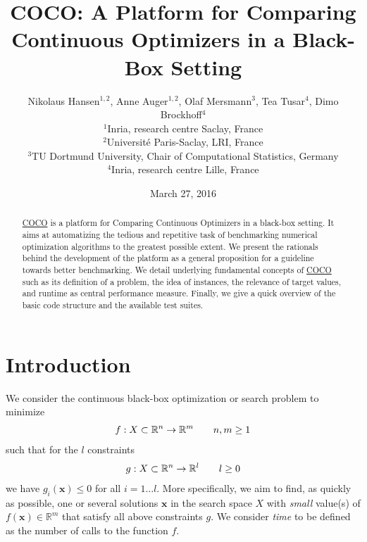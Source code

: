 \documentclass[letterpaper,12pt,english]{article}
\title{{COCO}: {A} Platform for Comparing Continuous Optimizers in a Black-Box Setting}
\date{March 27, 2016}
\author{Nikolaus Hansen$^{1,2}$, 
      Anne Auger$^{1,2}$, 
      Olaf Mersmann$^3$, 
      Tea Tusar$^4$, 
      Dimo Brockhoff$^4$
  \\
    $^1$Inria, research centre Saclay, France
  \\
   $^2$Universit\'e Paris-Saclay, LRI, France
  \\
    $^3$TU Dortmund University, Chair of Computational Statistics, Germany
  \\
    $^4$Inria, research centre Lille, France
    }
\newcommand{\chapter}[1]{}  %
\newcommand{\ve}[1]{{\boldsymbol{#1}}}
\newcommand{\x}{\ensuremath{\ve{x}}}
\begin{document}
\maketitle
{}\label{index::doc}



\chapter{CHAPTERTITLE}
\label{index:coco-a-platform-for-comparing-continuous-optimizers-in-a-black-box-setting}\label{index:chaptertitle}%
\begin{abstract}
\href{https://github.com/numbbo/coco}{COCO} is a platform for Comparing Continuous Optimizers in a black-box
setting.
It aims at automatizing the tedious and repetitive task of
benchmarking numerical optimization algorithms to the greatest possible
extent.
We present the rationals behind the development of the platform
as a general proposition for a guideline towards better benchmarking.
We detail underlying fundamental concepts of
\href{https://github.com/numbbo/coco}{COCO} such as its definition of
a problem, the idea of instances, the relevance of target values, and runtime
as central performance measure.
Finally, we  give a quick overview of the basic
code structure and the available test suites.
\end{abstract}\tableofcontents
\newpage

\section{Introduction}
\label{index:introduction}
We consider the continuous black-box optimization or search problem to minimize
\begin{gather}
\begin{split}f: X\subset\mathbb{R}^n \to \mathbb{R}^m \qquad n,m\ge1\end{split}\notag
\end{gather}
such that for the \(l\) constraints
\begin{gather}
\begin{split}g: X\subset\mathbb{R}^n \to \mathbb{R}^l \qquad l\ge0\end{split}\notag
\end{gather}
we have \(g_i(\x)\le0\) for all \(i=1\dots l\).
More specifically, we aim to find, as quickly as possible, one or several solutions \(\x\) in the search space \(X\) with \emph{small} value(s) of \(f(\x)\in\mathbb{R}^m\) that satisfy all above constraints \(g\).
We consider \emph{time} to be defined as the number of calls to the function \(f\).
\end{document}
